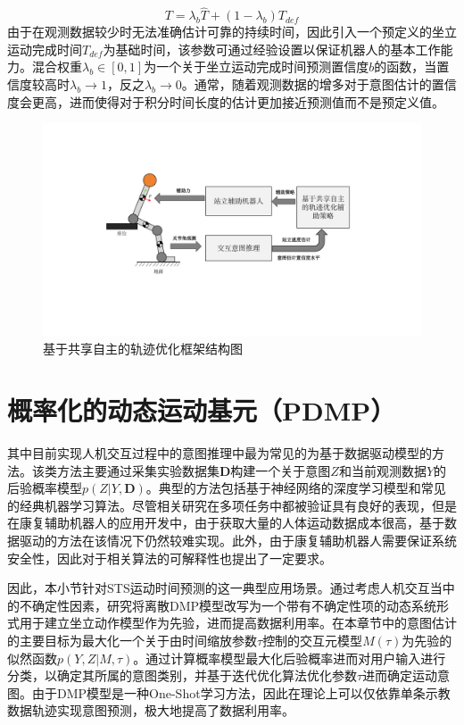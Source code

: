 \begin{equation}
    T=\lambda_b \hat T + (1-\lambda_b)T_{def}
    \label{eq:4-6}
\end{equation}
由于在观测数据较少时无法准确估计可靠的持续时间，因此引入一个预定义的坐立运动完成时间$T_{def}$为基础时间，该参数可通过经验设置以保证机器人的基本工作能力。混合权重$\lambda_b \in [0,1]$为一个关于坐立运动完成时间预测置信度$b$的函数，当置信度较高时$\lambda_b \rightarrow 1$，反之$\lambda_b \rightarrow 0$。通常，随着观测数据的增多对于意图估计的置信度会更高，进而使得对于积分时间长度的估计更加接近预测值而不是预定义值。

\begin{figure}[htb]
    \centering\includegraphics[width=1\textwidth]{figures/4-Fig-2.pdf}
    \caption{基于共享自主的轨迹优化框架结构图}
    \label{fig:4-2}
\end{figure}

\section{概率化的动态运动基元（PDMP）} 
其中目前实现人机交互过程中的意图推理中最为常见的为基于数据驱动模型的方法。该类方法主要通过采集实验数据集$\mathbf{D}$构建一个关于意图$Z$和当前观测数据$Y$的后验概率模型$p(Z|Y,\mathbf{D})$。典型的方法包括基于神经网络的深度学习模型和常见的经典机器学习算法。尽管相关研究在多项任务中都被验证具有良好的表现，但是在康复辅助机器人的应用开发中，由于获取大量的人体运动数据成本很高，基于数据驱动的方法在该情况下仍然较难实现。此外，由于康复辅助机器人需要保证系统安全性，因此对于相关算法的可解释性也提出了一定要求。

因此，本小节针对STS运动时间预测的这一典型应用场景。通过考虑人机交互当中的不确定性因素，研究将离散DMP模型改写为一个带有不确定性项的动态系统形式用于建立坐立动作模型作为先验，进而提高数据利用率。在本章节中的意图估计的主要目标为最大化一个关于由时间缩放参数$\tau$控制的交互元模型$M(\tau)$为先验的似然函数$p(Y,Z|M,\tau)$。通过计算概率模型最大化后验概率进而对用户输入进行分类，以确定其所属的意图类别，并基于迭代优化算法优化参数$\tau$进而确定运动意图。由于DMP模型是一种One-Shot学习方法，因此在理论上可以仅依靠单条示教数据轨迹实现意图预测，极大地提高了数据利用率。

